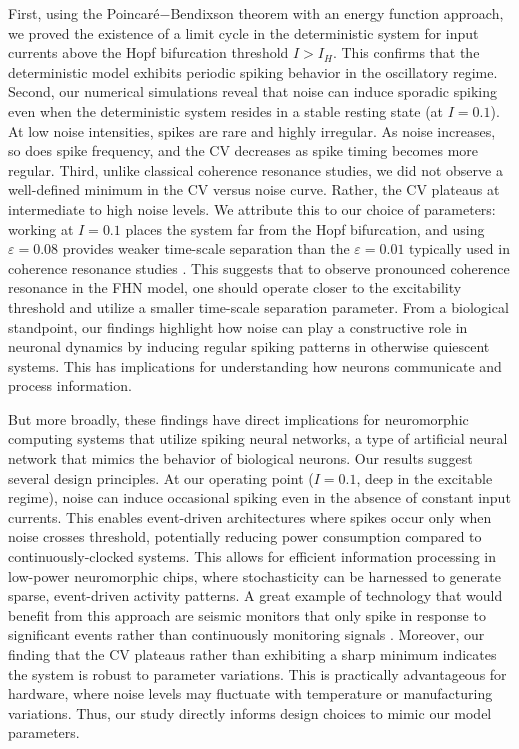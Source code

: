 \documentclass{article}
\begin{document}
First, using the Poincaré$-$Bendixson theorem with an energy function approach, we proved the existence of a limit cycle in the deterministic system for input currents above the Hopf bifurcation threshold $I > I_H$. This confirms that the deterministic model exhibits periodic spiking behavior in the oscillatory regime.
Second, our numerical simulations reveal that noise can induce sporadic spiking even when the deterministic system resides in a stable resting state (at $I = 0.1$). At low noise intensities, spikes are rare and highly irregular. As noise increases, so does spike frequency, and the CV decreases as spike timing becomes more regular.
Third, unlike classical coherence resonance studies, we did not observe a well-defined minimum in the CV versus noise curve. Rather, the CV plateaus at intermediate to high noise levels. We attribute this to our choice of parameters: working at $I = 0.1$ places the system far from the Hopf bifurcation, and using $\varepsilon = 0.08$ provides weaker time-scale separation than the $\varepsilon = 0.01$ typically used in coherence resonance studies \cite{pikovsky1997coherence}. This suggests that to observe pronounced coherence resonance in the FHN model, one should operate closer to the excitability threshold and utilize a smaller time-scale separation parameter.
From a biological standpoint, our findings highlight how noise can play a constructive role in neuronal dynamics by inducing regular spiking patterns in otherwise quiescent systems. This has implications for understanding how neurons communicate and process information.

But more broadly, these findings have direct implications for neuromorphic computing systems that utilize spiking neural networks, a type of artificial neural network that mimics the behavior of biological neurons. Our results suggest several design principles.
At our operating point ($I = 0.1$, deep in the excitable regime), noise can induce occasional spiking even in the absence of constant input currents. This enables event-driven architectures where spikes occur only when noise crosses threshold, potentially reducing power consumption compared to continuously-clocked systems. This allows for efficient information processing in low-power neuromorphic chips, where stochasticity can be harnessed to generate sparse, event-driven activity patterns. A great example of technology that would benefit from this approach are seismic monitors that only spike in response to significant events rather than continuously monitoring signals \cite{indiveri2011neuromorphic}.
Moreover, our finding that the CV plateaus rather than exhibiting a sharp minimum indicates the system is robust to parameter variations. This is practically advantageous for hardware, where noise levels may fluctuate with temperature or manufacturing variations. Thus, our study directly informs design choices to mimic our model parameters.
\end{document}
